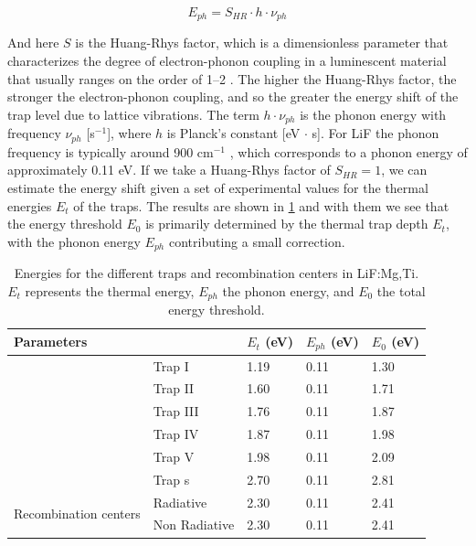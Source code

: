 \begin{equation}
  E_{ph} = S_{H\!R} \cdot h \cdot \nu_{ph}
\end{equation}

\vspace{7pt}

And here $S$ is the Huang-Rhys factor, which is a dimensionless parameter that characterizes the degree of electron-phonon coupling in a luminescent material that usually ranges on the order of 1--2 \cite{mckeever_1995}. The higher the Huang-Rhys factor, the stronger the electron-phonon coupling, and so the greater the energy shift of the trap level due to lattice vibrations. The term $h \cdot \nu_{ph}$ is the phonon energy with frequency $\nu_{ph}$ [s$^{-1}$], where $h$ is Planck's constant [eV $\cdot$ s]. For LiF the phonon frequency is typically around 900 cm$^{-1}$ \cite{bransden_atomics}, which corresponds to a phonon energy of approximately 0.11 eV. If we take a Huang-Rhys factor of $S_{HR} = 1$, we can estimate the energy shift given a set of experimental values for the thermal energies $E_t$ of the traps. The results are shown in \ref{tab:energythresholds} and with them we see that the energy threshold $E_0$ is primarily determined by the thermal trap depth $E_t$, with the phonon energy $E_{ph}$ contributing a small correction.

\renewcommand{\arraystretch}{1.5}
\begin{longtable}[c]{lllll}
\caption[Energies for the different traps and recombination centers in LiF:Mg,Ti.]{Energies for the different traps and recombination centers in LiF:Mg,Ti. $E_t$ represents the thermal energy, $E_{ph}$ the phonon energy, and $E_0$ the total energy threshold.}
\label{tab:energythresholds}\\
\hline
\multicolumn{2}{l}{Parameters}                            & $E_t$ (eV) & $E_{ph}$ (eV) & $E_0$ (eV) \\ \hline
\endhead
\hline
\endfoot
\endlastfoot
\multirow{6}{*}{Trapping Centers}      & Trap I        & 1.19       & 0.11         & 1.30       \\
                                       & Trap II       & 1.60       & 0.11         & 1.71       \\
                                       & Trap III      & 1.76       & 0.11         & 1.87       \\
                                       & Trap IV       & 1.87       & 0.11         & 1.98       \\
                                       & Trap V        & 1.98       & 0.11         & 2.09       \\
                                       & Trap s        & 2.70       & 0.11         & 2.81       \\ \hline
\multirow{2}{*}{Recombination centers} & Radiative     & 2.30       & 0.11         & 2.41       \\
                                       & Non Radiative & 2.30       & 0.11         & 2.41       \\ \hline
\end{longtable}


